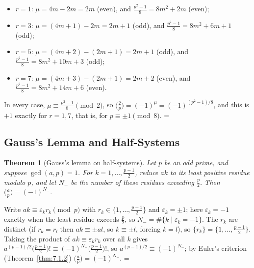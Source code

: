 \documentclass[11pt]{article}
\makeatletter
\let\nt@closedisplay\]
\def\nt@guardedclose{\@ifnextchar\par{\nt@closeafterpar}{\@ifnextchar\end{\postdisplaypenalty\@M\nt@closedisplay}{\nt@closedisplay}}}
\def\nt@closeafterpar\par{\@ifnextchar\par{\nt@closeafterpar}{\@ifnextchar\end{\postdisplaypenalty\@M\nt@closedisplay\par}{\nt@closedisplay\par}}}
\renewenvironment{proof}[1][\proofname]{\par
  \pushQED{\qed}\normalfont\topsep\medskipamount\edef\nt@afterproof{\@endparpenalty=\the\@endparpenalty\relax}\@beginparpenalty\@M\@endparpenalty\@M\let\]\nt@guardedclose\trivlist\item[]\textit{#1\@addpunct{.}} \ignorespaces}{\ifvmode\addpenalty\@M\fi\popQED\nt@afterproof\endtrivlist\@endpefalse}
\theoremstyle{ntstyle}
\newtheorem{theorem}{Theorem}[subsection]
\newcommand{\legs}[2]{\bigl(\tfrac{#1}{#2}\bigr)}
\makeatother
\begin{document}
\begin{proof}
  \begin{itemize}
    \item $r = 1$: $\mu = 4m - 2m = 2m$ (even), and $\tfrac{p^{2}-1}{8} = 8m^{2} + 2m$ (even);
    \item $r = 3$: $\mu = (4m+1) - 2m = 2m+1$ (odd), and
          $\tfrac{p^{2}-1}{8} = 8m^{2} + 6m + 1$ (odd);
    \item $r = 5$: $\mu = (4m+2) - (2m+1) = 2m+1$ (odd), and
          $\tfrac{p^{2}-1}{8} = 8m^{2} + 10m + 3$ (odd);
    \item $r = 7$: $\mu = (4m+3) - (2m+1) = 2m+2$ (even), and
          $\tfrac{p^{2}-1}{8} = 8m^{2} + 14m + 6$ (even).
  \end{itemize}

  In every case, $\mu \equiv \tfrac{p^{2}-1}{8} \pmod{2}$, so
  $\legs{2}{p} = (-1)^{\mu} = (-1)^{(p^{2}-1)/8}$, and this is $+1$
  exactly for $r = 1, 7$, that is, for $p \equiv \pm 1 \pmod{8}$.
\end{proof}
\subsection{Gauss's Lemma and Half-Systems}
\begin{theorem}[Gauss's lemma on half-systems]\label{thm:7.3.1}\label{thm:gauss-lemma-on-half-systems}
  Let $p$ be an odd
  prime, and suppose $\gcd(a, p) = 1$. For $k = 1, \ldots, \tfrac{p-1}{2}$,
  reduce $ak$ to its least positive residue modulo $p$, and let $N_{-}$
  be the number of these residues exceeding $\tfrac{p}{2}$. Then
  $\legs{a}{p} = (-1)^{N_{-}}$.

\end{theorem}

\begin{proof} Write $ak \equiv \varepsilon_k r_k \pmod{p}$
  with $r_k \in \{1, \ldots, \tfrac{p-1}{2}\}$ and $\varepsilon_k = \pm 1$; here $\varepsilon_k = -1$ exactly when
  the least residue exceeds
  $\tfrac{p}{2}$, so $N_{-} = \#\{k \mid \varepsilon_k = -1\}$. The $r_k$
  are distinct (if $r_k = r_l$ then $ak \equiv \pm al$, so $k \equiv \pm l$, forcing $k = l$), so
  $\{r_k\} = \{1, \ldots, \tfrac{p-1}{2}\}$. Taking the product of $ak \equiv \varepsilon_k r_k$ over all $k$ gives
  $a^{(p-1)/2}\big(\tfrac{p-1}{2}\big)! \equiv (-1)^{N_{-}}\big(\tfrac{p-1}{2}\big)!$, so
  $a^{(p-1)/2} \equiv (-1)^{N_{-}}$; by Euler's criterion (Theorem~\ref{thm:7.1.2}) $\legs{a}{p} = (-1)^{N_{-}}$.
\end{proof}
\end{document}
